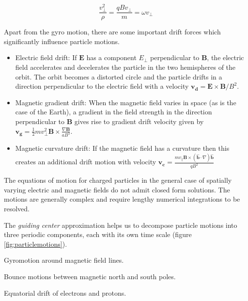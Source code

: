 \begin{equation}\label{eq:larmor}
    \frac{v^{2}_{\perp}}{\rho} = \frac{qBv_{\perp}}{m} = \omega v_{\perp}
\end{equation}

Apart from the gyro motion, there are some important drift forces which significantly influence particle motions.

\begin{itemize}
    \item Electric field drift: If $\mathbf{E}$ has a component $E_{\perp}$ perpendicular to $\mathbf{B}$, the electric 
    field accelerates and decelerates the particle in the two hemispheres of the orbit. The orbit becomes 
    a distorted circle and the particle drifts in a direction perpendicular to the electric field with a velocity 
    $\mathbf{v_d} = \mathbf{E} \times \mathbf{B} / B^2$.

    \item Magnetic gradient drift: When the magnetic field varies in space (as is the case of the Earth), a gradient in the 
    field strength in the direction perpendicular to $\mathbf{B}$ gives rise to gradient drift velocity given by 
    $\mathbf{v_g} = \frac{1}{2} m v^2_{\perp}\mathbf{B} \times \frac{\nabla \mathbf{B}}{aB^3}$.

    \item Magnetic curvature drift: If the magnetic field has a curvature then this creates an additional drift motion with 
    velocity $\mathbf{v_c} = \frac{ m v_{\parallel} \mathbf{B} \times (\hat{\mathbf{b}} \cdot \nabla) \hat{\mathbf{b}} }{qB^2}$
\end{itemize}

The equations of motion for charged particles in the general case of spatially varying electric and magnetic fields do not 
admit closed form solutions. The motions are generally complex and require lengthy numerical integrations to be resolved.


The \emph{guiding center} approximation helps us to decompose particle motions into three periodic components, each with 
its own time scale (figure \ref{fig:particlemotions}).
\begin{enumerate*}
    \item Gyromotion around magnetic field lines.
    \item Bounce motions between magnetic north and south poles.
    \item Equatorial drift of electrons and protons.
\end{enumerate*}


